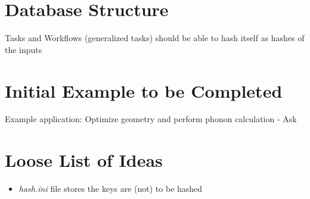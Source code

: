 \documentclass [notitlepage, 12pt, a4paper]{article}
\begin{document}
\section{Database Structure}
Tasks and Workflows (generalized tasks) should be able to hash itself as hashes of the inputs

\section{Initial Example to be Completed}
Example application: Optimize geometry and perform phonon calculation
- Ask

\section{Loose List of Ideas}
\begin{itemize}
	\item \emph{hash.ini} file stores the keys are (not) to be hashed
\end{itemize}
\end{document}
